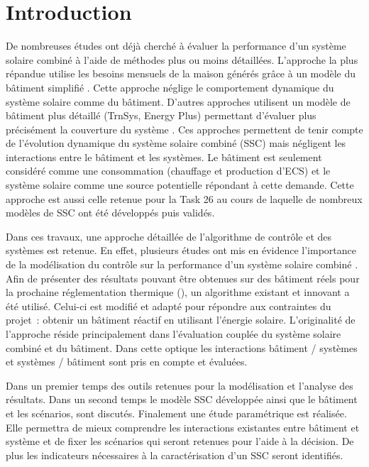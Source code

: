


\section{Introduction} %
\label{sec:introduction}
De nombreuses études ont déjà cherché à évaluer la performance d’un système solaire
combiné à l’aide de méthodes plus ou moins détaillées. L’approche la plus répandue utilise
les besoins mensuels de la maison générés grâce à un modèle du bâtiment simplifié
\parencite{Raffenel2009657,Martinopoulos2014130}. Cette approche néglige le comportement dynamique du système
solaire comme du bâtiment. D’autres approches utilisent un modèle de bâtiment plus
détaillé (TrnSys, Energy Plus) permettant d’évaluer plus précisément la couverture du
système \parencite{Glembin2012601}. Ces approches permettent de tenir compte de l’évolution dynamique du système
solaire combiné (SSC) mais négligent les interactions entre le bâtiment et les systèmes. Le
bâtiment est seulement considéré comme une consommation (chauffage et production d’ECS) et
le système solaire comme une source potentielle répondant à cette demande. Cette approche
est aussi celle retenue pour la Task 26 \parencite{Task262003} au cours de laquelle de nombreux modèles
de SSC ont été développés puis validés.

Dans ces travaux, une approche détaillée de l’algorithme de contrôle et des systèmes est retenue. En
effet, plusieurs études ont mis en évidence l’importance de la modélisation du contrôle
sur la performance d’un système solaire combiné \parencite{Kicsiny20123489,Huang20123278}.
Afin de présenter des résultats pouvant être obtenues sur des bâtiment réels pour la
prochaine réglementation thermique (), un algorithme existant et innovant
a été utilisé. Celui-ci est modifié et adapté pour répondre aux contraintes du projet~: obtenir
un bâtiment réactif en utilisant l’énergie solaire.
L’originalité de l’approche réside principalement dans l’évaluation couplée du système
solaire combiné et du bâtiment. Dans cette optique les interactions bâtiment / systèmes et
systèmes / bâtiment sont pris en compte et évaluées.

Dans un premier temps des outils retenues pour la modélisation et l’analyse des résultats.
Dans un second temps le modèle SSC développée ainsi que le bâtiment et les scénarios, sont
discutés. Finalement une étude paramétrique est réalisée. Elle permettra de mieux
comprendre les interactions existantes entre bâtiment et système et de fixer les scénarios
qui seront retenues pour l’aide à la décision. De plus les indicateurs nécessaires à la
caractérisation d’un SSC seront identifiés.


